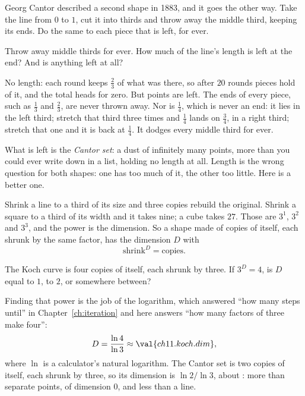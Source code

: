 \noindent
Georg Cantor described a second shape in 1883, and it goes the other way.
Take the line from $0$ to $1$, cut it into thirds and throw away the middle
third, keeping its ends. Do the same to each piece that is left, for ever.

\begin{think}
Throw away middle thirds for ever. How much of the line's length is left at
the end? And is anything left at all?
\end{think}
\begin{revealblock}
No length: each round keeps $\tfrac{2}{3}$ of what was there, so after
$20$ rounds  pieces hold  of
it, and the total heads for zero. But points are left. The ends of every
piece, such as $\tfrac{1}{3}$ and $\tfrac{2}{3}$, are never thrown away.
Nor is $\tfrac{1}{4}$, which is never an end: it lies in the left third;
stretch that third three times and $\tfrac{1}{4}$ lands on $\tfrac{3}{4}$,
in a right third; stretch that one and it is back at $\tfrac{1}{4}$. It
dodges every middle third for ever.
\end{revealblock}%
What is left is the \emph{Cantor set}: a dust of infinitely many points,
more than you could ever write down in a list, holding no length at all.
Length is the wrong question for both shapes: one has too much of it, the
other too little. Here is a better one.

Shrink a line to a third of its size and three copies rebuild the original.
Shrink a square to a third of its width and it takes nine; a cube takes
$27$. Those are $3^{1}$, $3^{2}$ and $3^{3}$, and the power is the
dimension. So a shape made of copies of itself, each shrunk by the same
factor, has the dimension $D$ with
\[ \text{shrink}^{D} = \text{copies}. \]

\begin{think}
The Koch curve is four copies of itself, each shrunk by three. If $3^{D} = 4$,
is $D$ equal to $1$, to $2$, or somewhere between?
\end{think}
Finding that power is the job of the logarithm, which answered \enquote{how
many steps until} in Chapter~\ref{ch:iteration} and here answers \enquote{how
many factors of three make four}:
\[ D = \frac{\ln 4}{\ln 3} \approx \val{ch11.koch.dim}, \]
where $\ln$ is a calculator's natural logarithm. The Cantor set is two copies
of itself, each shrunk by three, so its dimension is $\ln 2 / \ln 3$, about
: more than separate points, of dimension $0$, and less
than a line.

